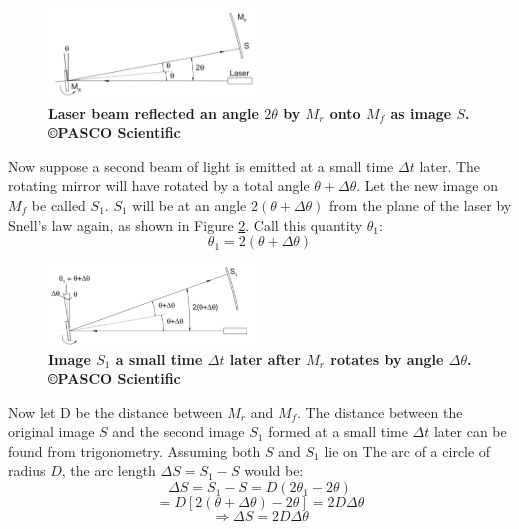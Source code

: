 \documentclass[twocolumn]{article}
\begin{document}
	\begin{figure}[!ht]
		\centering
		\includegraphics[width=0.49\textwidth]{Images/MrMfAngles.png}
		\caption{\textbf{Laser beam reflected an angle $2\theta$ by $M_r$ onto $M_f$ as image $S$.\cite{lee_instruction_????} \copyright PASCO Scientific}}
		\label{fig:MrMfAngles}
	\end{figure}
	Now suppose a second beam of light is emitted at a small time $\Delta t$ later. 
	The rotating mirror will have rotated by a total angle  $\theta + \Delta \theta$.
	Let the new image on $M_f$ be called $S_1$. 
	$S_1$ will be at an angle $2(\theta + \Delta \theta)$ from the plane of the laser by Snell's law again, as shown in Figure \ref{fig:MrMfAngles2}. 
	Call this quantity $\theta_1$:
	\begin{equation}
		\theta_1 = 2(\theta + \Delta \theta)
	\end{equation}
	\begin{figure}[!ht]
		\centering
		\includegraphics[width=0.49\textwidth]{Images/MrMfAngles2.png}
		\caption{\textbf{Image $S_1$ a small time $\Delta t$ later after $M_r$ rotates by angle $\Delta\theta$.\cite{lee_instruction_????} \copyright PASCO Scientific}}
		\label{fig:MrMfAngles2}
	\end{figure}
	
	Now let D be the distance between $M_r$ and $M_f$. 
	The distance between the original image $S$ and the second image $S_1$ formed at a small time $\Delta t$ later can be found from trigonometry. 
	Assuming both $S$ and $S_1$ lie on The arc of a circle of radius $D$, the arc length $\Delta S = S_1-S$ would be:
	\begin{equation*}
		\Delta S = S_1 - S = D(2\theta_1 - 2\theta)
	\end{equation*}
	\begin{equation*}
		= D[2(\theta + \Delta \theta) - 2\theta] = 2D\Delta\theta
	\end{equation*}
	\begin{equation}
		\Rightarrow \Delta S = 2D\Delta\theta
		\label{eq:DeltaS}
	\end{equation}
	
\end{document}
